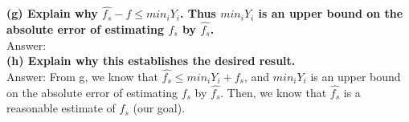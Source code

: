 \documentclass{article}
\begin{document}
\textbf{(g) Explain why $\hat{f_{s}} - f \leq min_i Y_i$. Thus $min_i Y_i$ is an upper bound on the absolute error of estimating $f_s$ by $\hat{f_{s}}$.} \\ \newline
Answer: \\ \newline
\textbf{(h) Explain why this establishes the desired result.} \\ \newline
Answer: From g, we know that $\hat{f_{s}}  \leq min_i Y_i + f_{s}$, and $ min_i Y_i$ is an upper bound on the absolute error of estimating $ f_{s}$ by  $\hat{f_{s}}$. Then, we know that  $\hat{f_{s}}$ is a reasonable estimate of $ f_{s}$ (our goal).\\ \newline
\end{document}
